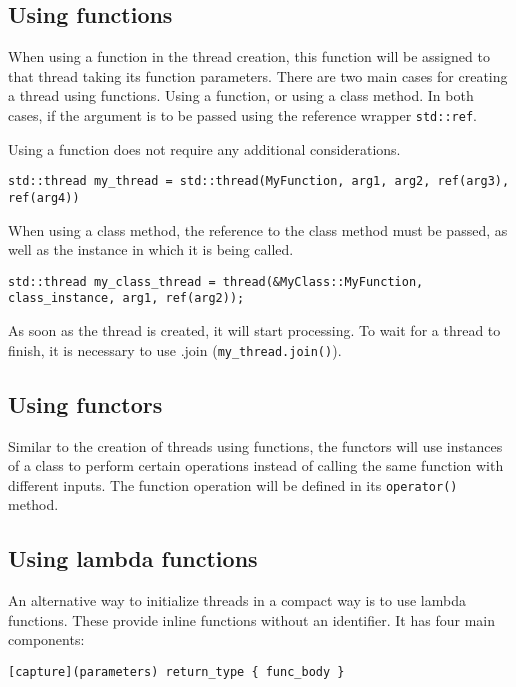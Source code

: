 \documentclass[conference]{IEEEtran}
\begin{document}
\subsection{Using functions}

When using a function in the thread creation, this function will be assigned to that thread taking its function parameters. There are two main cases for creating a thread using functions. Using a function, or using a class method. In both cases, if the argument is to be passed using the reference wrapper \verb|std::ref|.

Using a function does not require any additional considerations. 

\begin{lstlisting}
std::thread my_thread = std::thread(MyFunction, arg1, arg2, ref(arg3), ref(arg4))
\end{lstlisting}

When using a class method, the reference to the class method must be passed, as well as the instance in which it is being called. 

\begin{lstlisting}
std::thread my_class_thread = thread(&MyClass::MyFunction, class_instance, arg1, ref(arg2));
\end{lstlisting}

As soon as the thread is created, it will start processing. To wait for a thread to finish, it is necessary to use .join (\verb|my_thread.join()|).

\subsection{Using functors}

Similar to the creation of threads using functions, the functors will use instances of a class to perform certain operations instead of calling the same function with different inputs. The function operation will be defined in its \verb|operator()| method.

\subsection{Using lambda functions}

An alternative way to initialize threads in a compact way is to use lambda functions. These provide inline functions without an identifier. It has four main components:

\begin{lstlisting}
[capture](parameters) return_type { func_body }
\end{lstlisting}
\end{document}
